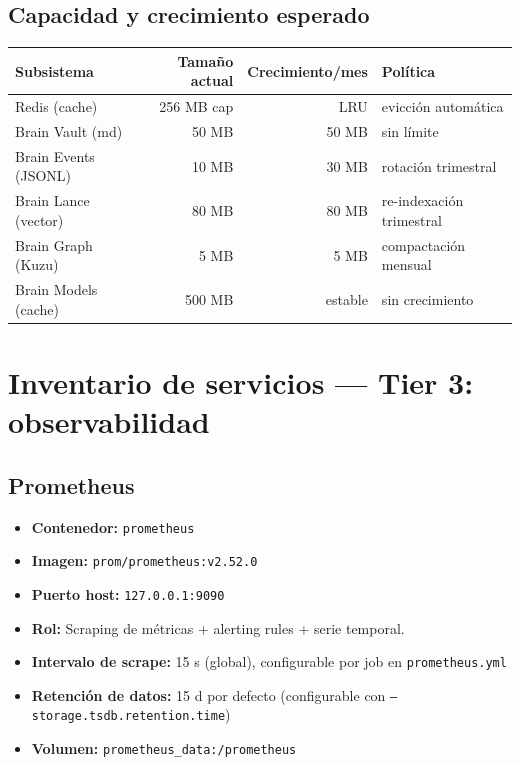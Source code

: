 \documentclass[11pt,a4paper]{article}
\newcommand{\dato}[2]{\textbf{\color{hermesblue}#1:} #2}
\begin{document}
\subsection{Capacidad y crecimiento esperado}

\begin{center}
\begin{tabular}{|l|r|r|l|}
\hline
\rowcolor{hermesblue}\color{white}\textbf{Subsistema} & \color{white}\textbf{Tamaño actual} & \color{white}\textbf{Crecimiento/mes} & \color{white}\textbf{Política}\\
\hline
Redis (cache) & 256 MB cap & LRU & evicción automática\\
Brain Vault (md) & ~50 MB & ~50 MB & sin límite\\
Brain Events (JSONL) & ~10 MB & ~30 MB & rotación trimestral\\
Brain Lance (vector) & ~80 MB & ~80 MB & re-indexación trimestral\\
Brain Graph (Kuzu) & ~5 MB & ~5 MB & compactación mensual\\
Brain Models (cache) & ~500 MB & estable & sin crecimiento\\
\hline
\end{tabular}
\end{center}

\newpage

\section{Inventario de servicios — Tier 3: observabilidad}

\subsection{Prometheus}

\begin{itemize}[leftmargin=*,itemsep=1pt]
\item \dato{Contenedor}{\texttt{prometheus}}
\item \dato{Imagen}{\texttt{prom/prometheus:v2.52.0}}
\item \dato{Puerto host}{\texttt{127.0.0.1:9090}}
\item \dato{Rol}{Scraping de métricas + alerting rules + serie temporal.}
\item \dato{Intervalo de scrape}{15 s (global), configurable por job en \texttt{prometheus.yml}}
\item \dato{Retención de datos}{15 d por defecto (configurable con \texttt{--storage.tsdb.retention.time})}
\item \dato{Volumen}{\texttt{prometheus\_data:/prometheus}}
\end{itemize}
\end{document}
